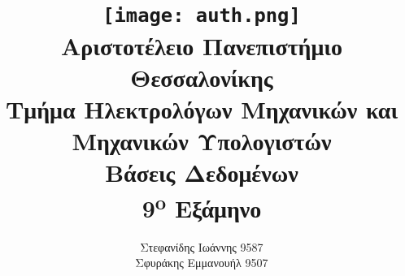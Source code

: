 \title{
	\texttt{[image: auth.png]}\\
	\large{Αριστοτέλειο Πανεπιστήμιο Θεσσαλονίκης}\\
	\large{Τμήμα Ηλεκτρολόγων Μηχανικών και Μηχανικών Υπολογιστών}\\
	\vspace{2cm}
	\LARGE{Βάσεις Δεδομένων}\\
	\vspace{0.5cm}
	\large{9\textsuperscript{o} Εξάμηνο}
	\vspace{3cm}
}

\author{
	Στεφανίδης Ιωάννης 9587\\
	Σφυράκης Εμμανουήλ 9507
	\vspace{3cm}
}
